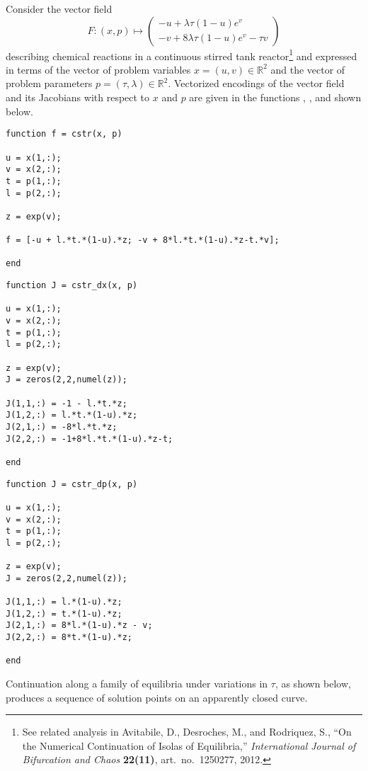 Consider the vector field
\begin{equation}
F:(x,p)\mapsto\left(\begin{array}{c}-u+\lambda \tau(1-u)e^v\\-v+8\lambda\tau(1-u)e^v-\tau v\end{array}\right)
\end{equation}
describing chemical reactions in a continuous stirred tank reactor\footnote{See related analysis in  Avitabile, D., Desroches, M., and Rodriquez, S., ``On the Numerical Continuation of Isolas of Equilibria,'' \emph{International Journal of Bifurcation and Chaos} \textbf{22(11)}, art.~no.~1250277, 2012.} and expressed in terms of the vector of problem variables $x=(u,v)\in\mathbb{R}^2$ and the vector of problem parameters $p=(\tau,\lambda)\in\mathbb{R}^2$. Vectorized encodings of the vector field and its Jacobians with respect to $x$ and $p$ are given in the functions , , and  shown below.
\begin{lstlisting}[language=coco-highlight]
function f = cstr(x, p)

u = x(1,:);
v = x(2,:);
t = p(1,:);
l = p(2,:);

z = exp(v);

f = [-u + l.*t.*(1-u).*z; -v + 8*l.*t.*(1-u).*z-t.*v];

end
\end{lstlisting}
\begin{lstlisting}[language=coco-highlight]
function J = cstr_dx(x, p)

u = x(1,:);
v = x(2,:);
t = p(1,:);
l = p(2,:);

z = exp(v);
J = zeros(2,2,numel(z));

J(1,1,:) = -1 - l.*t.*z;
J(1,2,:) = l.*t.*(1-u).*z;
J(2,1,:) = -8*l.*t.*z;
J(2,2,:) = -1+8*l.*t.*(1-u).*z-t;

end
\end{lstlisting}
\begin{lstlisting}[language=coco-highlight]
function J = cstr_dp(x, p)

u = x(1,:);
v = x(2,:);
t = p(1,:);
l = p(2,:);

z = exp(v);
J = zeros(2,2,numel(z));

J(1,1,:) = l.*(1-u).*z;
J(1,2,:) = t.*(1-u).*z;
J(2,1,:) = 8*l.*(1-u).*z - v;
J(2,2,:) = 8*t.*(1-u).*z;

end
\end{lstlisting}
Continuation along a family of equilibria under variations in $\tau$, as shown below, produces a sequence of solution points on an apparently closed curve.
